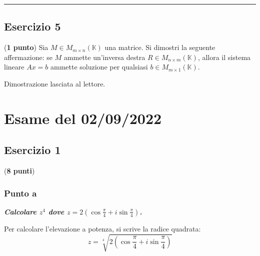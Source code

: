 \documentclass[a4paper]{article}
\newcommand{\longline}{\noindent\rule{\textwidth}{0.4pt}}
\begin{document}
	\longline

	\subsection{Esercizio 5}

	(\textbf{1 punto}) Sia $M \in M_{m \times n}\left(\mathbb{K}\right)$ una matrice. Si dimostri la seguente affermazione: se $M$ ammette un'inversa destra $R \in M_{n \times m}\left(\mathbb{K}\right)$, allora il sistema lineare $Ax = b$ ammette soluzione per qualsiasi $b \in M_{m \times 1}\left(\mathbb{K}\right)$.\newline

	\noindent
	Dimostrazione lasciata al lettore.
	
	\newpage
	\section{Esame del 02/09/2022}

	\subsection{Esercizio 1}

	(\textbf{8 punti})

	\subsubsection{Punto a}

	\textcolor{Green4}{\textbf{\emph{Calcolare $z^{4}$ dove $z = 2\left(\cos\frac{\pi}{4} + i \sin\frac{\pi}{4}\right)$.}}}\newline

	\noindent
	Per calcolare l'elevazione a potenza, si scrive la radice quadrata:
	\begin{equation*}
		z = \sqrt[4]{2\left(\cos\frac{\pi}{4} + i \sin\frac{\pi}{4}\right)}
	\end{equation*}\newpage
\end{document}
